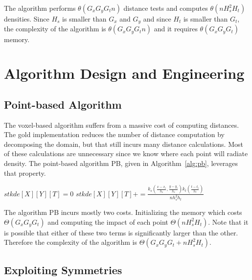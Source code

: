 \documentclass{article}
\begin{document}
The algorithm performs $\theta(G_x G_y G_t n)$ distance tests and
computes $\theta(n H_s^2 H_t )$ densities. Since $H_s$ is smaller than
$G_x$ and $G_y$ and since $H_t$ is smaller than $G_t$, the complexity of the
algorithm is $\theta(G_x G_y G_t n )$ and it requires $\theta(G_x G_y G_t)$
memory.

\section{Algorithm Design and Engineering}

\label{sec:algo-seq}

\subsection{Point-based Algorithm}
The voxel-based algorithm suffers from a massive cost of computing
distances. The gold implementation reduces the number of distance computation by 
decomposing the domain, but that still incurs many distance calculations.
Most of these calculations are unnecessary since we know
where each point will radiate density. The point-based
algorithm PB, given in Algorithm~\ref{alg:pb}, leverages that
property.

\begin{algorithm}
\caption{\textsc{PB}}
\begin{algorithmic}
  \State $stkde[X][Y][T] = 0$
\EndFor
%
        \State $stkde[X][Y][T] += \frac{k_s(\frac{x-x_i}{h_s},\frac{y-y_i}{h_s}) k_t(\frac{t-t_i}{h_t})}{n h_s^2h_t}$
        \EndIf
      \EndFor
    \EndFor
  \EndFor
\EndFor
\end{algorithmic}
\label{alg:pb}
\end{algorithm}

The algorithm PB incurs mostly two costs. Initializing the memory which costs
$\Theta(G_x G_y G_t)$ and computing the impact of each point
$\Theta(n H_s^2 H_t)$. Note that it is possible that either of these
two terms is significantly larger than the other. Therefore the
complexity of the algorithm is $\Theta(G_x G_y G_t + n H_s^2 H_t)$.

\subsection{Exploiting Symmetries}
\end{document}
